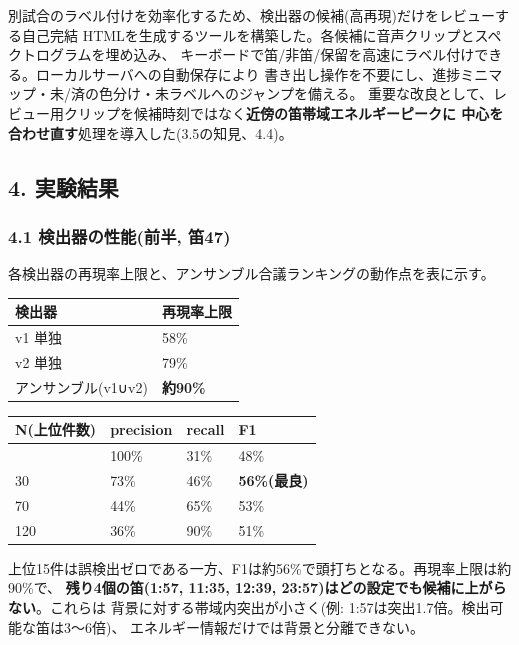 \documentclass[
  japanese,
]{ltjsarticle}
\newcounter{none} %
\begin{document}
別試合のラベル付けを効率化するため、検出器の候補(高再現)だけをレビューする自己完結
HTMLを生成するツールを構築した。各候補に音声クリップとスペクトログラムを埋め込み、
キーボードで笛/非笛/保留を高速にラベル付けできる。ローカルサーバへの自動保存により
書き出し操作を不要にし、進捗ミニマップ・未/済の色分け・未ラベルへのジャンプを備える。
重要な改良として、レビュー用クリップを候補時刻ではなく\textbf{近傍の笛帯域エネルギーピークに
中心を合わせ直す}処理を導入した(3.5の知見、4.4)。

\subsection{4. 実験結果}\label{ux5b9fux9a13ux7d50ux679c}

\subsubsection{4.1 検出器の性能(前半,
笛47)}\label{ux691cux51faux5668ux306eux6027ux80fdux524dux534a-ux7b1b47}

各検出器の再現率上限と、アンサンブル合議ランキングの動作点を表に示す。

{\def\LTcaptype{none} %
\begin{longtable}[]{@{}ll@{}}
\toprule\noalign{}
検出器 & 再現率上限 \\
\midrule\noalign{}
\endhead
\bottomrule\noalign{}
\endlastfoot
v1 単独 & 58\% \\
v2 単独 & 79\% \\
アンサンブル(v1∪v2) & \textbf{約90\%} \\
\end{longtable}
}

{\def\LTcaptype{none} %
\begin{longtable}[]{@{}llll@{}}
\toprule\noalign{}
N(上位件数) & precision & recall & F1 \\
\midrule\noalign{}
\endhead
\bottomrule\noalign{}
\endlastfoot
15 & 100\% & 31\% & 48\% \\
30 & 73\% & 46\% & \textbf{56\%(最良)} \\
70 & 44\% & 65\% & 53\% \\
120 & 36\% & 90\% & 51\% \\
\end{longtable}
}

上位15件は誤検出ゼロである一方、F1は約56\%で頭打ちとなる。再現率上限は約90\%で、
\textbf{残り4個の笛(1:57, 11:35, 12:39,
23:57)はどの設定でも候補に上がらない}。これらは
背景に対する帯域内突出が小さく(例:
1:57は突出1.7倍。検出可能な笛は3〜6倍)、
エネルギー情報だけでは背景と分離できない。
\end{document}
